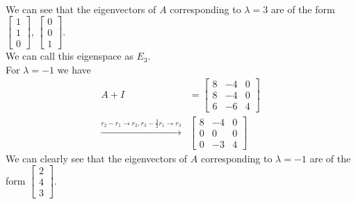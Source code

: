 \documentclass[answers,12pt,addpoints]{exam}
\begin{document}
\begin{questions}
\begin{solution}
\begin{align*}
        \end{align*}
        We can see that the eigenvectors of $A$ corresponding to $\lambda = 3$ are of the form $\begin{bmatrix}
            1\\
            1\\
            0
        \end{bmatrix}$, $\begin{bmatrix}
            0\\
            0\\
            1
        \end{bmatrix}$.\\
        We can call this eigenspace as $E_{3}$.\\
        For $\lambda = -1$ we have
        \begin{align*}
            A + I &= \begin{bmatrix}
                8 & -4 & 0\\
                8 & -4 & 0\\
                6 & -6 & 4
            \end{bmatrix}\\
            \xrightarrow{r_2 - r_1 \to r_2, r_3 - \frac{3}{2}r_1 \to r_3} &\begin{bmatrix}
                8 & -4 & 0\\
                0 & 0 & 0\\
                0 & -3 & 4
            \end{bmatrix}
        \end{align*}
        We can clearly see that the eigenvectors of $A$ corresponding to $\lambda = -1$ are of the form $\begin{bmatrix}
            2\\
            4\\
            3
        \end{bmatrix}$.
    \end{solution}


\end{questions}
\end{document}
